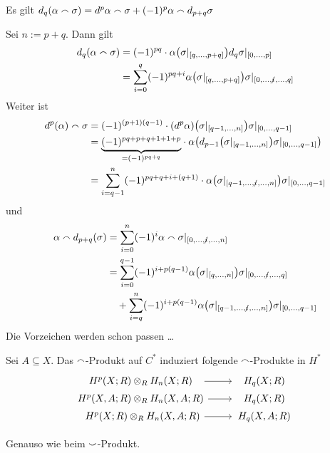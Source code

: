 \begin{lemma}[{name=[Produktregel für das Cap-Produkt]}]
	Es gilt $d_q(\alpha \smallfrown \sigma) = d^p \alpha \smallfrown \sigma + (-1)^p \alpha \smallfrown d_{p+q} \sigma$
\end{lemma}
\begin{beweis}
	Sei $n := p+q$. Dann gilt
	\begin{align}
		d_q(\alpha \capp \sigma) &= (-1)^{pq} \cdot \alpha \enbrace*{\sigma|_{\benbrace*{q,\ldots ,p+q}}} d_q \sigma|_{\benbrace*{0,\ldots ,p}} \\
		&= \sum_{i=0}^{q} (-1)^{pq+i}  \alpha \enbrace*{\sigma|_{\benbrace*{q,\ldots ,p+q}}} \sigma|_{\benbrace*{0, \ldots ,\slashedi,\ldots ,q}} 
	\end{align}
	Weiter ist 
	\begin{align}
		d^p(\alpha) \capp \sigma &= (-1)^{(p+1)(q-1)} \cdot (d^p \alpha) \enbrace*{\sigma|_{\benbrace*{q-1,\ldots ,n}}} \sigma|_{\benbrace*{0,\ldots ,q-1}} \\
		&= \Underbrace{(-1)^{pq+p+q+1+1+p}}{=(-1)^{pq+q}} \cdot \alpha \enbrace*{ d_{p-1} \enbrace*{\sigma|_{\benbrace*{q-1,\ldots ,n}}} \sigma|_{\benbrace*{0, \ldots ,q-1}}} \\
		&= \sum_{i=q-1}^{n} (-1)^{pq+q+i+(q+1)} \cdot \alpha \enbrace*{\sigma|_{\benbrace*{q-1,\ldots,\slashedi,\ldots ,n}}} \sigma|_{\benbrace*{0, \ldots ,q-1}}
	\end{align}
	und
	\begin{align}
		\alpha \capp d_{p+q}(\sigma) &= \sum_{i=0}^{n} (-1)^i \alpha \capp \sigma |_{\benbrace*{0, \ldots , \slashedi,\ldots ,n}} \\
		&= \sum_{i=0}^{q-1} (-1)^{i+p(q-1)} \alpha \enbrace*{\sigma|_{\benbrace*{q,\ldots ,n}}} \sigma|_{\benbrace*{0,\ldots , \slashedi,\ldots ,q}}\\
		&\hspace{1em}+ \sum_{i=q}^{n} (-1)^{i+p(q-1)} \alpha \enbrace*{\sigma|_{\benbrace*{q-1,\ldots,\slashedi,\ldots,n}}} \sigma|_{\benbrace*{0, \ldots ,q-1}}
	\end{align}
	Die Vorzeichen werden schon passen \ldots 
\end{beweis}

\begin{lemma}
	Sei $A \subseteq X$. Das $\smallfrown$-Produkt auf $C^*$ induziert folgende $\smallfrown$-Produkte in $H^*$
	\[
		\begin{tikzcd}[row sep=0em]
			\minwidthbox{H^p(X;R) \otimes_R H_n(X;R)}{4.2cm} \rar & \minwidthbox{H_q(X;R)}{2cm} \\
			\minwidthbox{H^p(X,A;R) \otimes_R H_n(X,A;R)}{4.2cm} \rar & \minwidthbox{H_q(X;R)}{2cm} \\
			\minwidthbox{\hfill H^p(X;R) \otimes_R H_n(X,A;R)}{4.2cm} \rar & \minwidthbox{H_q(X,A;R)}{2cm}
		\end{tikzcd}
	\]
\end{lemma}
\begin{beweis}
	Genauso wie beim $\smallsmile$-Produkt.
\end{beweis}

